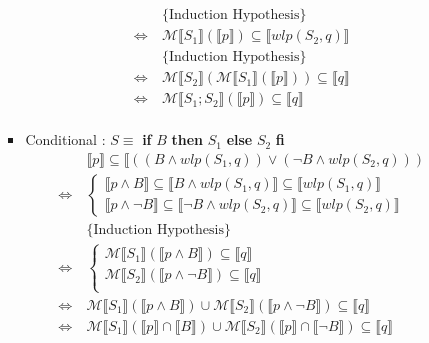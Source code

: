 \documentclass[11pt]{article}
\begin{document}
\begin{enumerate}
\begin{enumerate}
\begin{itemize}
\begin{align*}
						&\{\text{Induction Hypothesis}\}\\
						\Leftrightarrow ~& \mathcal{M}\llbracket S_{1} \rrbracket(\llbracket p \rrbracket) \subseteq \llbracket wlp(S_{2}, q) \rrbracket\\
						&\{\text{Induction Hypothesis}\}\\
						\Leftrightarrow ~& \mathcal{M}\llbracket S_{2} \rrbracket(\mathcal{M} \llbracket S_{1} \rrbracket (\llbracket p \rrbracket)) \subseteq \llbracket q \rrbracket\\
						\Leftrightarrow ~& \mathcal{M} \llbracket S_{1};S_{2} \rrbracket(\llbracket p \rrbracket) \subseteq \llbracket q \rrbracket\\
					\end{align*}
				\item Conditional : $S\equiv$ \textbf{if} $B$ \textbf{then} $S_{1}$ \textbf{else} $S_{2}$ \textbf{fi}
					\begin{align*}
						& \llbracket p \rrbracket \subseteq \llbracket ((B \land wlp(S_{1}, q)) \lor (\neg B \land wlp(S_{2}, q)))\\
						\Leftrightarrow ~& \begin{cases}
							\llbracket p \land B \rrbracket \subseteq \llbracket B \land wlp(S_{1}, q) \rrbracket \subseteq \llbracket wlp(S_{1}, q) \rrbracket\\
							\llbracket p \land \neg B \rrbracket \subseteq \llbracket \neg B \land wlp(S_{2}, q) \rrbracket \subseteq \llbracket wlp(S_{2}, q) \rrbracket
						\end{cases}\\
						&\{\text{Induction Hypothesis}\}\\
						\Leftrightarrow ~& \begin{cases}
							\mathcal{M}\llbracket S_{1} \rrbracket (\llbracket p \land B \rrbracket) \subseteq \llbracket q \rrbracket\\
							\mathcal{M}\llbracket S_{2} \rrbracket (\llbracket p \land \neg B \rrbracket) \subseteq \llbracket q \rrbracket\\
						\end{cases}\\
						\Leftrightarrow ~& \mathcal{M}\llbracket S_{1} \rrbracket (\llbracket p \land B \rrbracket) \cup \mathcal{M}\llbracket S_{2} \rrbracket (\llbracket p \land \neg B \rrbracket) \subseteq \llbracket q \rrbracket\\
						\Leftrightarrow ~& \mathcal{M}\llbracket S_{1} \rrbracket (\llbracket p \rrbracket \cap \llbracket B \rrbracket) \cup \mathcal{M}\llbracket S_{2} \rrbracket (\llbracket p \rrbracket \cap \llbracket \neg B \rrbracket) \subseteq \llbracket q \rrbracket\\

\end{align*}
\end{itemize}
\end{enumerate}
\end{enumerate}
\end{document}
